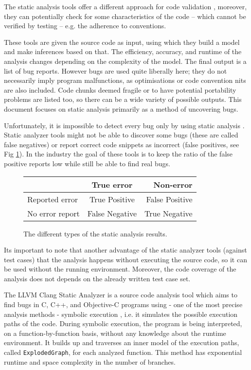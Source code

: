 \documentclass[oneside, a4paper, 12pt]{article}
\theoremstyle{definition}
\begin{document}
The static analysis tools offer a different approach for code validation 
\cite{Zhivich2009} \cite{Bessey2010}, moreover, they can potentially check for 
some characteristics of the code -- which cannot be verified by testing -- e.g. 
the adherence to conventions.

These tools are given the source code as input, using which they build a model 
and make inferences based on that. The efficiency, accuracy, and runtime of the 
analysis changes depending on the complexity of the model.
The final output is a list of bug reports. However bugs are used quite 
liberally here; they do not necessarily imply program malfunctions, as 
optimisations or code convention nits are also included. Code chunks deemed 
fragile or to have potential portability problems are listed too, so there can 
be a wide variety of possible outputs.
This document focuses on static analysis primarily as a method of uncovering 
bugs.
 
Unfortunately, it is impossible to detect every 
bug only by using static analysis \cite{Rice:53}. Static analyzer tools might 
not be able to discover some bugs (these are called false negatives) or report 
correct code snippets as incorrect (false positives, see Fig \ref{fig:bes}). In 
the industry the goal of these tools is to keep the ratio of the false positive 
reports low while still be able to find real bugs.

\begin{figure}[!h]
	\begin{center}
		\begin{tabular}{ | l | c | r | }
			\hline
			& True error   & Non-error \\ \hline
			Reported error   & True Positive  & False Positive   \\ \hline
			No error report & False Negative & True Negative    \\
			\hline
		\end{tabular}
	\end{center}
	\caption{The different types of the static analysis results.}
	\label{fig:bes}
\end{figure}

Its important to note that another advantage of the static analyzer tools 
(against test cases) that the analysis happens without executing the source 
code, so it can be used without the running environment. Moreover, the code 
coverage of the analysis does not depends on the already written test case set. 


The LLVM Clang Static Analyzer is a source code analysis tool which aims to 
find bugs in C,
C++, and Objective-C programs using - one of the most precise analysis methods 
- symbolic execution  \cite{King1975} \cite{Hampapuram2005} , i.e. it simulates 
the possible execution paths of the code. During symbolic execution, the 
program is being interpreted, on a function-by-function basis, without any 
knowledge about the runtime environment. It builds up and traverses an inner 
model of the execution paths, called \texttt{ExplodedGraph}, for each analyzed 
function. This method has exponential runtime and space complexity in the 
number of branches.
\end{document}
